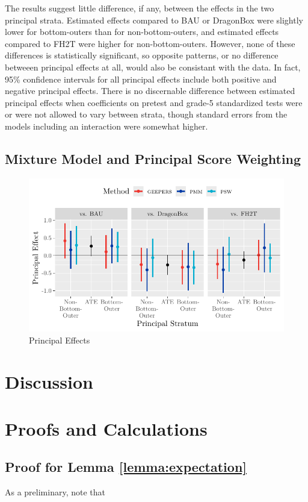 \documentclass[11pt]{article} %
\begin{document}
The results suggest little difference, if any, between the effects in the two principal strata.
Estimated effects compared to BAU or DragonBox were slightly lower for bottom-outers than for non-bottom-outers, and estimated effects compared to FH2T were higher for non-bottom-outers.
However, none of these differences is statistically significant, so opposite patterns, or no difference betweeen principal effects at all, would also be consistant with the data.
In fact, 95\% confidence intervals for all principal effects include both positive and negative principal effects.
There is no discernable difference between estimated principal effects when coefficients on pretest and grade-5 standardized tests were or were not allowed to vary between strata, though standard errors from the models including an interaction were somewhat higher.

\subsection{Mixture Model and Principal Score Weighting}
\begin{figure}
  \centering
  \includegraphics{../figure/compareMethods.pdf}
  \caption{Principal Effects}
  \label{fig:compare}
\end{figure}



\section{Discussion}

\appendix
\section{Proofs and Calculations}
\subsection{Proof for Lemma \ref{lemma:expectation}}
As a preliminary, note that
\end{document}
